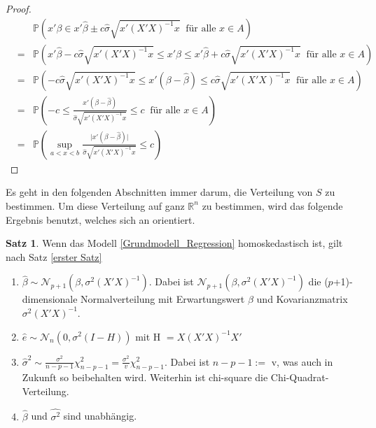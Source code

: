 \documentclass[12pt,a4paper]{article}
\theoremstyle{definition}
\theoremstyle{definition}
\newtheorem{Satz}[Definition]{Satz}
\theoremstyle{definition}
\theoremstyle{definition}
\begin{document}
\begin{proof}
\begin{eqnarray*}
&& \mathbb{P}( x'\beta \in x' \hat{\beta} \pm c \hat{\sigma} \sqrt{x' (X'X)^{-1}x} ~ \text{ für alle } x \in A ) \\
&=& \mathbb{P}( x' \hat{\beta} - c \hat{\sigma} \sqrt{x' (X'X)^{-1}x} \leq x'\beta \leq x' \hat{\beta} + c \hat{\sigma} \sqrt{x' (X'X)^{-1}x} ~ \text{ für alle } x \in A ) \\
&=& \mathbb{P}( - c \hat{\sigma} \sqrt{x' (X'X)^{-1}x} \leq x' (\beta - \hat{\beta}) \leq  c \hat{\sigma} \sqrt{x' (X'X)^{-1}x} ~ \text{ für alle } x \in A ) \\
&=& \mathbb{P}( - c  \leq \frac{x' (\beta - \hat{\beta})}{\hat{\sigma} \sqrt{x' (X'X)^{-1}x}}  \leq  c ~ \text{ für alle } x \in A ) \\
&=& \mathbb{P}( \sup_{a<x<b}  \frac{\vert x'(\beta - \hat{\beta}) \vert}{\hat{\sigma} \sqrt{x'(X'X)^{-1}x}}  \leq c)
\end{eqnarray*}
\end{proof}

Es geht in den folgenden Abschnitten immer darum, die Verteilung von $S$ zu bestimmen. Um diese Verteilung auf ganz $\mathbb{R}^n$ zu bestimmen, wird das folgende Ergebnis benutzt, welches sich an \cite[6]{Liu64} orientiert. 

\begin{Satz} \label{Basiseigenschaften}
Wenn das Modell \eqref{Grundmodell_Regression} homoskedastisch ist, gilt nach Satz \ref{erster Satz} 

\begin{enumerate}
\item $\hat{\beta} \sim \mathscr{N}_{p+1}(\beta,\sigma^2(X'X)^{-1})$. Dabei ist $\mathscr{N}_{p+1}(\beta,\sigma^2(X'X)^{-1})$ die ($p$+1)-dimensionale Normalverteilung mit Erwartungswert $\beta$ und Kovarianzmatrix $\sigma^2 (X'X)^{-1}$.
\item $\hat{e} \sim \mathscr{N}_{n}(0,\sigma^2(I-H)) $ mit  \gls{H} $=X(X'X)^{-1}X' $
\item $\hat{\sigma}^2 \sim \frac{\sigma^2}{n-p-1}\chi_{n-p-1}^2 = \frac{\sigma^2}{v}\chi^2_{n-p-1}$. Dabei ist $n-p-1 :=$ \gls{v}, was auch in Zukunft so beibehalten wird. Weiterhin ist \gls{chi-square} die Chi-Quadrat-Verteilung.
\item $\hat{\beta}$ und $\widehat{\sigma^2}$ sind unabhängig.
\end{enumerate}
\end{Satz}
\end{document}
